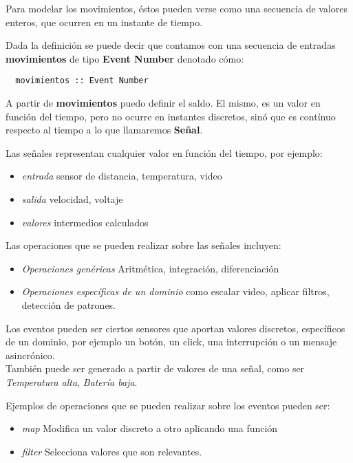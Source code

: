   Para modelar los movimientos, éstos pueden verse como una
secuencia de valores enteros, que ocurren en un instante de tiempo.

  Dada la definición se puede decir que contamos con una secuencia de
entradas \textbf{movimientos} de tipo \textbf{Event Number} denotado cómo:

\begin{verbatim}
  movimientos :: Event Number
\end{verbatim}

  A partir de \textbf{movimientos} puedo definir el saldo.
El mismo, es un valor en función del tiempo, pero no ocurre en
instantes discretos, sinó que es contínuo respecto al tiempo a lo
que llamaremos \textbf{Señal}.

  Las señales representan cualquier valor en función del tiempo,
por ejemplo:

\begin{itemize}
\item \textit{entrada} sensor de distancia, temperatura, video
\item \textit{salida} velocidad, voltaje
\item \textit{valores} intermedios calculados
\end{itemize}

Las operaciones que se pueden realizar sobre las señales incluyen:

\begin{itemize}
\item \textit{Operaciones genéricas} Aritmética, integración, diferenciación
\item \textit{Operaciones específicas de un dominio} como escalar video, aplicar filtros, detección de patrones.
\end{itemize}

Los eventos pueden ser ciertos sensores que aportan valores discretos,
específicos de un dominio, por ejemplo un
botón, un click, una interrupción o un mensaje asincrónico.\\
También puede ser generado a partir de valores de una señal,
como ser \emph{Temperatura alta}, \emph{Batería baja}.

Ejemplos de operaciones que se pueden realizar sobre los eventos pueden ser:

\begin{itemize}
\item \textit{map} Modifica un valor discreto a otro aplicando una función
\item \textit{filter} Selecciona valores que son relevantes.
\end{itemize}


